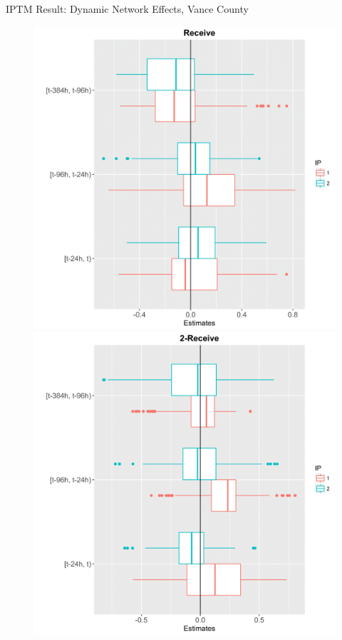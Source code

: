 \documentclass[10pt]{beamer}
\theoremstyle{definition}
\theoremstyle{remark}
\newenvironment{changemargin}[2]{%
  \begin{list}{}{%
    \setlength{\topsep}{0pt}%
    \setlength{\leftmargin}{#1}%
    \setlength{\rightmargin}{#2}%
    \setlength{\listparindent}{\parindent}%
    \setlength{\itemindent}{\parindent}%
    \setlength{\parsep}{\parskip}%
  }%
  \item[]}{\end{list}}
\begin{document}
\begin{frame}{IPTM Result: Dynamic Network Effects, Vance County}
\begin{changemargin}{-1cm}{-1cm}

	\begin{figure}
		\includegraphics[width=.55\textwidth]{figures/VanceBReceive-1.png} \includegraphics[width=.55\textwidth]{figures/Vance2Receive-1.png}
	\end{figure}	
	
\end{changemargin}
\end{frame}
\end{document}
